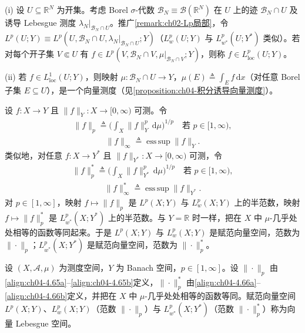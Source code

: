 \documentclass[../../main.tex]{subfiles}%
\begin{document}
\begin{remark}\label{remark:ch04-区域Lp}
(i) 设 $U\subseteq\mathbb{R}^N$ 为开集。考虑 Borel $\sigma$-代数 $\mathcal{B}_N\equiv\mathcal{B}(\mathbb{R}^N)$ 在 $U$ 上的迹 $\mathcal{B}_N\cap U$ 及诱导 Lebesgue 测度 $\lambda_N|_{\mathcal{B}_N\cap U}$。推广\cref{remark:ch02-Lp局部}，令 $L^p(U;Y)\equiv L^p(U,\mathcal{B}_N\cap U,\lambda_N|_{\mathcal{B}_N\cap U};Y)$（$L^p_w(U;Y)$ 与 $L^p_{w^*}(U;Y^*)$ 类似）。若对每个开子集 $V\Subset U$ 有 $f\in L^p(V,\mathcal{B}_N\cap V,\mu|_{\mathcal{B}_N\cap V};Y)$，则称 $f\in L^p_{\mathrm{loc}}(U;Y)$。

(ii) 若 $f\in L^1_{\mathrm{loc}}(U;Y)$，则映射 $\mu:\mathcal{B}_N\cap U\to Y$，$\mu(E)\triangleq \int_E f\,\mathrm{d}x$（对任意 Borel 子集 $E\subseteq U$），是一个向量测度（见\cref{proposition:ch04-积分诱导向量测度}）。
\end{remark}

设 $f:X\to Y$ 且 $\|f\|_Y:X\to[0,\infty)$ 可测。令
\begin{align}
\|f\|_p\triangleq \Big(\int_X\|f\|_Y^p\,\mathrm{d}\mu\Big)^{1/p}\quad\text{若 }p\in[1,\infty), \label{align:ch04-4.65a}
\end{align}
\begin{align}
\|f\|_\infty\triangleq \operatorname*{ess\,sup}\|f\|_Y. \label{align:ch04-4.65b}
\end{align}
类似地，对任意 $f:X\to Y^*$ 且 $\|f\|_{Y^*}:X\to[0,\infty)$ 可测，令
\begin{align}
\|f\|_p^*\triangleq \Big(\int_X\|f\|_{Y^*}^p\,\mathrm{d}\mu\Big)^{1/p}\quad\text{若 }p\in[1,\infty), \label{align:ch04-4.66a}
\end{align}
\begin{align}
\|f\|_\infty^*\triangleq \operatorname*{ess\,sup}\|f\|_{Y^*}. \label{align:ch04-4.66b}
\end{align}
对 $p\in[1,\infty]$，映射 $f\mapsto\|f\|_p$ 是 $L^p(X;Y)$ 与 $L^p_w(X;Y)$ 上的半范数，映射 $f\mapsto\|f\|_p^*$ 是 $L^p_{w^*}(X;Y^*)$ 上的半范数。与 $Y=\mathbb{R}$ 时一样，把在 $X$ 中 $\mu$-几乎处处相等的函数等同起来。于是 $L^p(X;Y)$ 与 $L^p_w(X;Y)$ 是赋范向量空间，范数为 $\|\cdot\|_p$；$L^p_{w^*}(X;Y^*)$ 是赋范向量空间，范数为 $\|\cdot\|_p^*$。

\begin{definition}[向量 Lebesgue 空间]\label{definition:ch04-向量Lebesgue}
设 $(X,\mathcal{A},\mu)$ 为测度空间，$Y$ 为 Banach 空间，$p\in[1,\infty]$。设 $\|\cdot\|_p$ 由\eqref{align:ch04-4.65a}--\eqref{align:ch04-4.65b}定义，$\|\cdot\|_p^*$ 由\eqref{align:ch04-4.66a}--\eqref{align:ch04-4.66b}定义，并把在 $X$ 中 $\mu$-几乎处处相等的函数等同。赋范向量空间 $L^p(X;Y)$、$L^p_w(X;Y)$（范数 $\|\cdot\|_p$）与 $L^p_{w^*}(X;Y^*)$（范数 $\|\cdot\|_p^*$）称为向量 Lebesgue 空间。
\end{definition}
\end{document}
